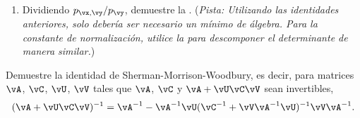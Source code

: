 \documentclass[../../book-main.tex]{subfiles}
\begin{document}
\begin{exercise}
\begin{enumerate}
\begin{align}
\begin{bmatrix}
                    \vx-\vmu_{\vx} \\
                    \vy-\vmu_{\vy}
                \end{bmatrix}
                \\
                &\qquad=
                \begin{bmatrix}
                    \vx - \vm \\
                    \vy - \vmu_{\vy}
                \end{bmatrix}^\top
                \begin{bmatrix}
                    \left(\vSigma_{\vx} - \vSigma_{\vx\vy}
                        \vSigma_{\vy}^{-1}
                    \vSigma_{\vx\vy}^{\top}\right)^{-1} & \Zero \\
                    \Zero & \vSigma_{\vy}^{-1}
                \end{bmatrix}
                \begin{bmatrix}
                    \vx - \vm \\
                    \vy - \vmu_{\vy}
                \end{bmatrix},
            \end{align}
            donde $\vm = \vmu_{\vx} +
            \vSigma_{\vx\vy}\vSigma_{\vy}^{-1}(\vy
            - \vmu_{\vy})$.
        \item Dividiendo $p_{\vx, \vy} / p_{\vy}$, demuestre la 
            . (\textit{Pista:
                    Utilizando las identidades anteriores,
                    solo debería ser necesario
                    un mínimo de álgebra.
                    Para la constante de normalización,
                    utilice la
                    para
            descomponer el determinante de manera similar.})

    \end{enumerate}

\end{exercise}

\begin{exercise}\label{exercise:sherman_morrison_woodbury_identity}
    Demuestre la identidad de Sherman-Morrison-Woodbury, es decir, para matrices
    \(\vA\), \(\vC\), \(\vU\), \(\vV\) tales que \(\vA\), \(\vC\) y
    \(\vA + \vU\vC\vV\) sean invertibles,
    \begin{equation}
        (\vA + \vU\vC\vV)^{-1} = \vA^{-1} - \vA^{-1}\vU(\vC^{-1} +
        \vV\vA^{-1}\vU)^{-1}\vV\vA^{-1}.
    \end{equation}
\end{exercise}
\end{document}
